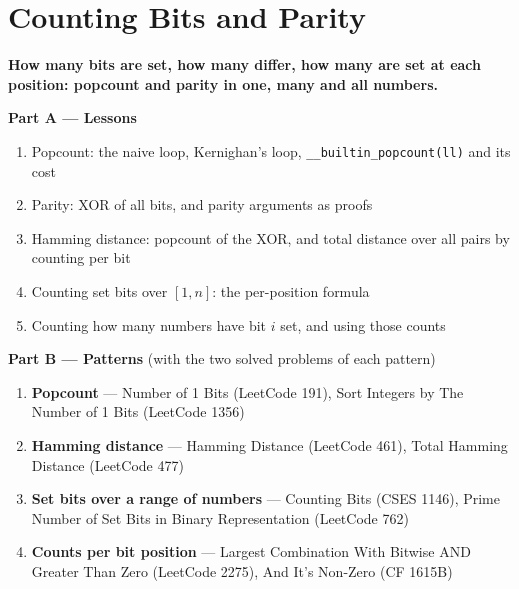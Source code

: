 \chapter{Counting Bits and Parity}
\label{ch:popcount}

\begin{tcolorbox}[enhanced, colback=white, colframe=secondaryblue, boxrule=1pt, arc=2mm]
\textbf{\large\textcolor{primaryblue}{How many bits are set, how many differ, how many are set at each position: popcount and parity in one, many and all numbers.}}
\end{tcolorbox}


\begin{plannedbox}
\textbf{Part A --- Lessons}
\begin{enumerate}[leftmargin=*, label=\textbf{A\arabic*.}, itemsep=1pt]
    \item Popcount: the naive loop, Kernighan's loop, \texttt{\_\_builtin\_popcount(ll)} and its cost
    \item Parity: XOR of all bits, and parity arguments as proofs
    \item Hamming distance: popcount of the XOR, and total distance over all pairs by counting per bit
    \item Counting set bits over $[1, n]$: the per-position formula
    \item Counting how many numbers have bit $i$ set, and using those counts
\end{enumerate}
\textbf{Part B --- Patterns} (with the two solved problems of each pattern)
\begin{enumerate}[leftmargin=*, label=\textbf{P\arabic*.}, itemsep=1pt]
    \item \textbf{Popcount} --- Number of 1 Bits {\small\color{darkgray}(LeetCode 191)}, Sort Integers by The Number of 1 Bits {\small\color{darkgray}(LeetCode 1356)}
    \item \textbf{Hamming distance} --- Hamming Distance {\small\color{darkgray}(LeetCode 461)}, Total Hamming Distance {\small\color{darkgray}(LeetCode 477)}
    \item \textbf{Set bits over a range of numbers} --- Counting Bits {\small\color{darkgray}(CSES 1146)}, Prime Number of Set Bits in Binary Representation {\small\color{darkgray}(LeetCode 762)}
    \item \textbf{Counts per bit position} --- Largest Combination With Bitwise AND Greater Than Zero {\small\color{darkgray}(LeetCode 2275)}, And It's Non-Zero {\small\color{darkgray}(CF 1615B)}
\end{enumerate}
\end{plannedbox}
